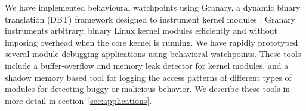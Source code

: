 \documentclass[letterpaper,twocolumn,10pt]{article}
\begin{document}



We have implemented behavioural watchpoints using Granary, a dynamic binary translation (DBT) framework designed to instrument kernel modules \cite{GranaryAtOSDI, DynamoRIOKernel}. Granary instruments arbitrary, binary Linux kernel modules efficiently and without imposing overhead when the core kernel is running. We have rapidly prototyped several module debugging applications using behavioral watchpoints. These tools include a buffer-overflow and memory leak detector for kernel modules, and a shadow memory based tool for logging the access patterns of different types of modules for detecting buggy or malicious behavior. We describe these tools in more detail in section~\ref{sec:applications}.









\end{document}
